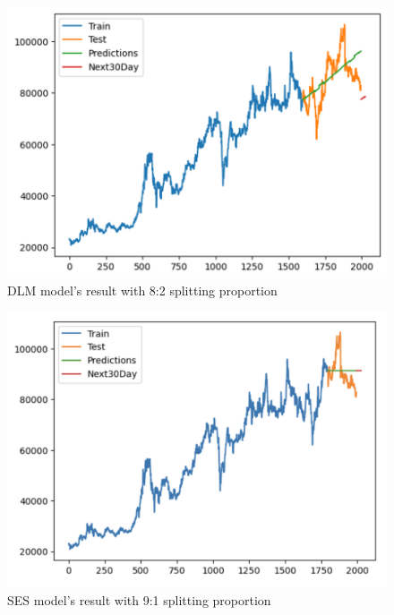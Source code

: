 \documentclass{ieeeojies}
\begin{document}
\begin{figure}[H]
  \centering
  \begin{minipage}{0.8\linewidth}
    \centering
    \includegraphics[width=\linewidth]{bibliography/DLM_VCB82.png}
    \caption{DLM model's result with 8:2 splitting proportion}
    \label{fig13}
  \end{minipage}
\end{figure}
\begin{figure}[H]
  \centering
  \begin{minipage}{0.8\linewidth}
    \centering
    \includegraphics[width=\linewidth]{bibliography/ETS_VCB91.png}
    \caption{SES model's result with 9:1 splitting proportion}
    \label{fig14}
  \end{minipage}
\end{figure}
\end{document}
